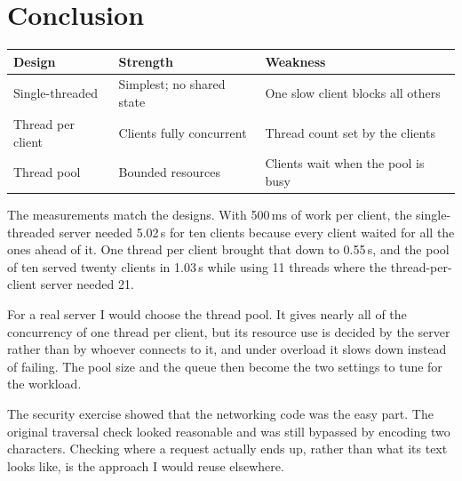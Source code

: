 \documentclass[11pt,a4paper]{article}
\begin{document}
\section{Conclusion}

\begin{center}
\begin{tabular}{@{}lll@{}}
\toprule
Design & Strength & Weakness \\
\midrule
Single-threaded & Simplest; no shared state & One slow client blocks all others \\
Thread per client & Clients fully concurrent & Thread count set by the clients \\
Thread pool & Bounded resources & Clients wait when the pool is busy \\
\bottomrule
\end{tabular}
\end{center}

The measurements match the designs. With 500\,ms of work per client, the
single-threaded server needed 5.02\,s for ten clients because every client
waited for all the ones ahead of it. One thread per client brought that down
to 0.55\,s, and the pool of ten served twenty clients in 1.03\,s while using
11 threads where the thread-per-client server needed 21.

For a real server I would choose the thread pool. It gives nearly all of the
concurrency of one thread per client, but its resource use is decided by the
server rather than by whoever connects to it, and under overload it slows down
instead of failing. The pool size and the queue then become the two settings
to tune for the workload.

The security exercise showed that the networking code was the easy part.
The original traversal check looked reasonable and was still bypassed by
encoding two characters. Checking where a request actually ends up, rather
than what its text looks like, is the approach I would reuse elsewhere.
\end{document}
